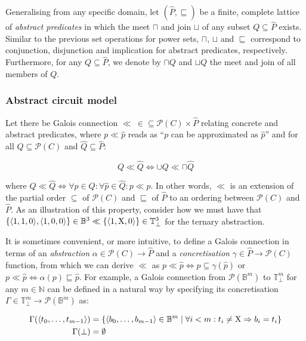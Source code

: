 Generalising from any specific domain, let $(\hat P,\sqsubseteq)$ be a finite, complete lattice of \textit{abstract predicates} in which the meet $\sqcap$ and join $\sqcup$ of any subset $Q \subseteq \hat P$ exists. Similar to the previous set operations for power sets, $\sqcap$, $\sqcup$ and $\sqsubseteq$ correspond to conjunction, disjunction and implication for abstract predicates, respectively. Furthermore, for any $Q \subseteq \hat P$, we denote by $\sqcap Q$ and $\sqcup Q$ the meet and join of all members of $Q$.

\subsubsection{Abstract circuit model}

Let there be Galois connection $\ll \: \in \left. \subseteq \mathcal{P}(C) \times \hat P \right.$ relating concrete and abstract predicates, where $p \ll \hat p$ reads as ``$p$ can be approximated as $\hat p$'' and for all $Q \subseteq \mathcal{P}(C)$ and $\hat Q \subseteq \hat P$:

\begin{equation*}
Q \ll \hat Q \iff \cup Q \ll \sqcap \hat Q
\end{equation*}

\noindent where $Q \ll \hat Q \iff \forall p \in Q : \forall \hat p \in \hat Q : p \ll \hat p$. In other words, $\ll$ is an extension of the partial order $\subseteq$ of $\mathcal{P}(C)$ and $\sqsubseteq$ of $\hat P$ to an ordering between $\mathcal{P}(C)$ and $\hat P$. As an illustration of this property, consider how we must have that $\{ \langle 1,1,0 \rangle, \langle 1,0,0 \rangle \} \in \mathbb{B}^{3} \ll \{ \langle 1, \mathrm{X}, 0  \rangle \} \in \mathbb{T}_{\bot}^{3}$ for the ternary abstraction.

It is sometimes convenient, or more intuitive, to define a Galois connection in terms of an \textit{abstraction} $\alpha \in \mathcal{P}(C) \rightarrow \hat P$ and a \textit{concretisation} $\gamma \in \hat P \rightarrow \mathcal{P}(C)$ function, from which we can derive $\ll$ as $p \ll \hat p \iff p \subseteq \gamma(\hat p)$ or $p \ll \hat p \iff \alpha (p) \sqsubseteq \hat p$. For example, a Galois connection from $\mathcal{P}(\mathbb{B}^{m})$ to $\mathbb{T}_{\bot}^{m}$ for any $m \in \mathbb{N}$ can be defined in a natural way by specifying its concretisation $\Gamma \in \mathbb{T}_{\bot}^{m} \rightarrow \mathcal{P}(\mathbb{B}^{m})$ as:

\begin{align*}
\Gamma ( \langle t_{0},\dots,t_{m-1} \rangle ) &= \{ \langle b_{0},\dots,b_{m-1} \rangle \in \mathbb{B}^{m} \mid \forall i < m : t_{i} \neq \mathrm{X} \Rightarrow b_{i} = t_{i} \} \\
\Gamma ( \bot ) &= \emptyset
\end{align*}

